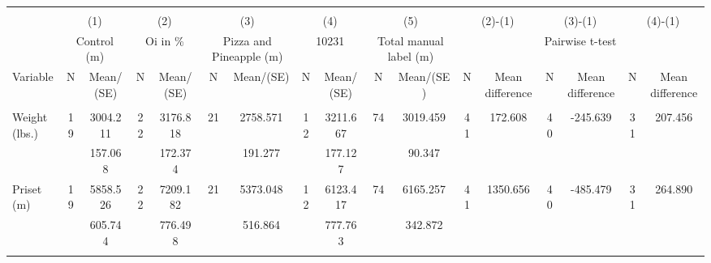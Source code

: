 \begin{tabular}{@{\extracolsep{5pt}}lcccccccccccccccc}
\\[-1.8ex]\hline \hline \\[-1.8ex]
 & \multicolumn{2}{c}{(1)}  & \multicolumn{2}{c}{(2)}  & \multicolumn{2}{c}{(3)}  & \multicolumn{2}{c}{(4)}  & \multicolumn{2}{c}{(5)}  & \multicolumn{2}{c}{(2)-(1)} & \multicolumn{2}{c}{(3)-(1)} & \multicolumn{2}{c}{(4)-(1)} \\
 & \multicolumn{2}{c}{Control (m)}  & \multicolumn{2}{c}{Oi in \%}  & \multicolumn{2}{c}{Pizza and Pineapple (m)}  & \multicolumn{2}{c}{10231}  & \multicolumn{2}{c}{Total manual label (m)}  & \multicolumn{6}{c}{Pairwise t-test}  \\
Variable & N & Mean/(SE) & N & Mean/(SE) & N & Mean/(SE) & N & Mean/(SE) & N & Mean/(SE) & N & Mean difference & N & Mean difference & N & Mean difference \\ \hline \\[-1.8ex] 
Weight (lbs.)   & 19    &  3004.211    & 22    &  3176.818    & 21    &  2758.571    & 12    &  3211.667    & 74    &  3019.459    & 41    &   172.608    & 40    &  -245.639    & 31    &   207.456   \\
 &   &   157.068  &   &   172.374  &   &   191.277  &   &   177.127  &   &    90.347  &   &  &   &  &   &   \\
Priset (m)   & 19    &  5858.526    & 22    &  7209.182    & 21    &  5373.048    & 12    &  6123.417    & 74    &  6165.257    & 41    &  1350.656    & 40    &  -485.479    & 31    &   264.890   \\
 &   &   605.744  &   &   776.498  &   &   516.864  &   &   777.763  &   &   342.872  &   &  &   &  &   &   \\
\hline \\[-1.8ex]

\end{tabular}
